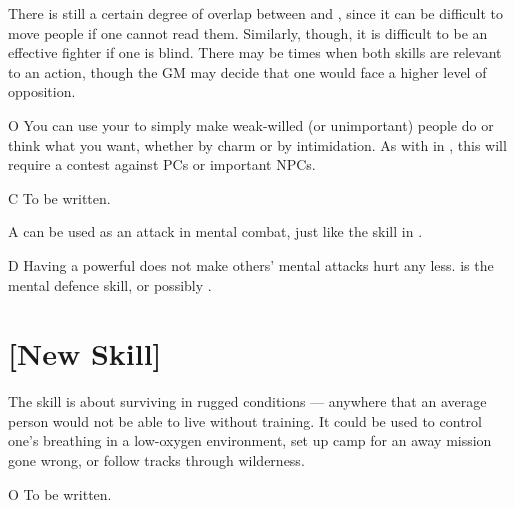 \documentclass[12pt,titlepage,openany]{book}
\begin{document}
There is still a certain degree of overlap between  and
, since it can be difficult to move people if one cannot read
them. Similarly, though, it is difficult to be an effective fighter if one is
blind. There may be times when both skills are relevant to an action, though
the GM may decide that one would face a higher level of opposition.

\vspace{1ex}

\begin{NewSkillAction}{O}
    You can use your  to simply make weak-willed (or
    unimportant) people do or think what you want, whether by charm or by
    intimidation. As with  in \FateCore{}, this will require a
    contest against PCs or important NPCs.
\end{NewSkillAction}

\begin{NewSkillAction}[+]{C}
    To be written.
\end{NewSkillAction}

\begin{NewSkillAction}{A}
     can be used as an attack in mental combat, just like the
     skill in \FateCore{}.
\end{NewSkillAction}

\begin{NewSkillAction}{D}
    Having a powerful  does not make others' mental attacks
    hurt any less.  is the mental defence skill, or possibly
    .
\end{NewSkillAction}

\section{ [New Skill]}\label{sec:survival}

The  skill is about surviving in rugged conditions --- anywhere
that an average person would not be able to live without training. It could be
used to control one's breathing in a low-oxygen environment, set up camp for an
away mission gone wrong, or follow tracks through wilderness.

\vspace{1ex}

\begin{NewSkillAction}[+]{O}
    To be written.
\end{NewSkillAction}
\end{document}
